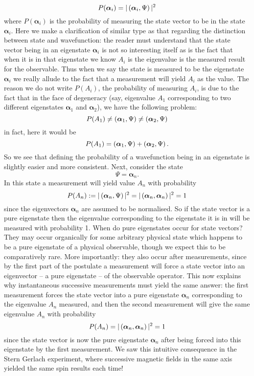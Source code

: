 $$
P(\bm{\alpha}_{i})=|\left(\bm{\alpha}_{i},\Psi\right)|^2
$$
where $P(\bm{\alpha}_{i})$ is the probability of measuring the state vector to be in the state $\bm{\alpha}_{i}$. Here we make a clarification of similar type as that regarding the distinction between state and wavefunction: the reader must understand that the state vector being in an eigenstate $\bm{\alpha}_{i}$ is not so interesting itself as is the fact that when it is in that eigenstate we know $A_{i}$ is the eigenvalue is the measured result for the observable. Thus when we say the state is measured to be the eigenstate $\bm{\alpha}_{i}$ we really allude to the fact that a measurement will yield $A_{i}$ as the value. The reason we do not write $P(A_{i})$, the probability of measuring $A_{i}$, is due to the fact that in the face of degeneracy (say, eigenvalue $A_{1}$ corresponding to two different eigenstates $\bm{\alpha}_{1}$ and $\bm{\alpha}_{2}$), we have the following problem:
$$
P(A_{1})\neq\left(\bm{\alpha}_{1},\Psi\right)\neq\left(\bm{\alpha}_{2},\Psi\right)
$$
in fact, here it would be 
$$
P(A_{1})=\left(\bm{\alpha}_{1},\Psi\right)+\left(\bm{\alpha}_{2},\Psi\right).
$$
So we see that defining the probability of a wavefunction being in an eigenstate is slightly easier and more consistent. Next,
consider the state 
$$
\Psi=\bm{\alpha}_{n}.
$$
In this state a measurement will yield value $A_{n}$ with probability 
$$
P(A_{n}):=|\left(\bm{\alpha}_{n},\Psi\right)|^2=|\left(\bm{\alpha}_{n},\bm{\alpha}_{n}\right)|^2=1
$$
since the eigenvectors $\bm{\alpha}_{n}$ are assumed to be normalised. So if the state vector is a pure eigenstate then the eigenvalue corresponding to the eigenstate it is in will be measured with probability 1. When do pure eigenstates occur for state vectors? They may occur organically for some arbitrary physical state which happens to be a pure eigenstate of a physical observable, though we expect this to be comparatively rare. More importantly: they also occur after measurements, since by the first part of the postulate a measurement will force a state vector into an eigenvector -- a pure eigenstate -- of the observable operator. This now explains why instantaneous successive measurements must yield the same answer: the first measurement forces the state vector into a pure eigenstate $\bm{\alpha}_{n}$ corresponding to the eigenvalue $A_{n}$ measured, and then the second measurement will give the same eigenvalue $A_{n}$ with probability
$$
P(A_{n})=|\left(\bm{\alpha}_{n},\bm{\alpha}_{n}\right)|^2=1
$$
since the state vector is now the pure eigenstate $\bm{\alpha}_{n}$ after being forced into this eigenstate by the first measurement. We saw this intuitive consequence in the Stern Gerlach experiment, where successive magnetic fields in the same axis yielded the same spin results each time!
